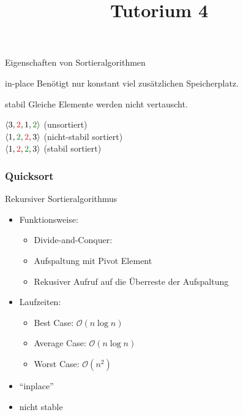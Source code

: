 
\title[Algorithmen I SS 14]{Tutorium 4}

\usepackage{alltt}





\begin{frame}
  \maketitle
\end{frame}

\begin{frame}{Eigenschaften von Sortieralgorithmen}
	\begin{block}{in-place}
		Benötigt nur konstant viel zusätzlichen Speicherplatz.
	\end{block}
	\begin{block}{stabil}
		Gleiche Elemente werden nicht vertauscht.

		$\langle 3, {\color{red}{2}}, 1, {\color{english}{2}}\rangle$ (unsortiert)\\
		$\langle 1, {\color{english}{2}}, {\color{red}{2}}, 3\rangle$ (nicht-stabil sortiert)\\
		$\langle 1, {\color{red}{2}}, {\color{english}{2}}, 3\rangle$ (stabil sortiert)
	\end{block}
\end{frame}

\begin{frame}
	\frametitle{Quicksort}
	Rekursiver Sortieralgorithmus
	\begin{itemize}
		\item Funktionsweise:
		\begin{itemize}
			\item Divide-and-Conquer:
			\item Aufspaltung mit Pivot Element
			\item Rekusiver Aufruf auf die Überreste der Aufspaltung
		\end{itemize}
		\item Laufzeiten:
		\begin{itemize}
			\item Best Case: $\mathcal{O}(n \log{n})$
			\item Average Case: $\mathcal{O}(n \log{n})$
			\item Worst Case: $\mathcal{O}(n^2)$
		\end{itemize}
		\item {\color{orange}  "`inplace"'} 
		\item {\color{red} nicht stable}
	\end{itemize}
\end{frame}

